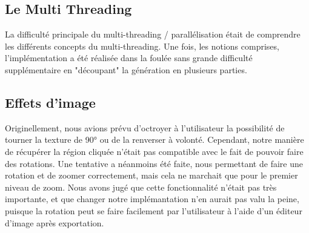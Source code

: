 \documentclass{article}
\begin{document}
	\subsection{Le Multi Threading}
	La difficulté principale du multi-threading / parallélisation était de comprendre les différents concepts du multi-threading.
	Une fois, les notions comprises, l'implémentation a été réalisée dans la foulée sans grande difficulté supplémentaire en "découpant" la génération en plusieurs parties.

	\subsection{Effets d'image}

	Originellement, nous avions prévu d'octroyer à l'utilisateur la possibilité de tourner la texture de 90° ou de la renverser à volonté.
	Cependant, notre manière de récupérer la région cliquée n'était pas compatible avec le fait de pouvoir faire des rotations.
	Une tentative a néanmoins été faite, nous permettant de faire une rotation et de zoomer correctement, mais cela ne marchait que pour le premier niveau de zoom.
	Nous avons jugé que cette fonctionnalité n'était pas très importante, et que changer notre implémantation n'en aurait pas valu la peine, puisque la rotation peut se faire facilement par l'utilisateur à l'aide d'un éditeur d'image après exportation.
\end{document}
